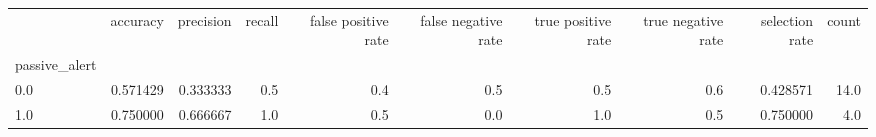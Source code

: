 \begin{tabular}{lrrrrrrrrr}
\toprule
{} &  accuracy &  precision &  recall &  false positive rate &  false negative rate &  true positive rate &  true negative rate &  selection rate &  count \\
passive\_alert &           &            &         &                      &                      &                     &                     &                 &        \\
\midrule
0.0           &  0.571429 &   0.333333 &     0.5 &                  0.4 &                  0.5 &                 0.5 &                 0.6 &        0.428571 &   14.0 \\
1.0           &  0.750000 &   0.666667 &     1.0 &                  0.5 &                  0.0 &                 1.0 &                 0.5 &        0.750000 &    4.0 \\
\bottomrule
\end{tabular}
